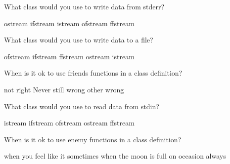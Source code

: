 \documentclass[10pt,addpoints]{exam}
\begin{document}
\begin{questions}
\par\vspace{0.100000in}\begin{minipage}{\linewidth}
\question[2]
What class would you use to write data from stderr?
\medskip
\begin{choices}
\choice ostream
\choice ifstream
\choice istream
\choice ofstream
\choice ffstream
\end{choices}
\setlength\answerlinelength{1in}
\answerline[A]

\end{minipage}


\par\vspace{0.100000in}\begin{minipage}{\linewidth}
\question[2]
What class would you use to write data to a file?
\medskip
\begin{choices}
\choice ofstream
\choice ifstream
\choice ffstream
\choice ostream
\choice istream
\end{choices}
\setlength\answerlinelength{1in}
\answerline[A]

\end{minipage}


\par\vspace{0.100000in}\begin{minipage}{\linewidth}
\question[2]
When is it ok to use friends functions in a class definition?
\medskip
\begin{choices}
\choice not right
\choice Never
\choice still wrong
\choice other
\choice wrong
\end{choices}
\setlength\answerlinelength{1in}
\answerline[B]

\end{minipage}


\par\vspace{0.100000in}\begin{minipage}{\linewidth}
\question[2]
What class would you use to read data from stdin?
\medskip
\begin{choices}
\choice istream
\choice ifstream
\choice ofstream
\choice ostream
\choice ffstream
\end{choices}
\setlength\answerlinelength{1in}
\answerline[A]

\end{minipage}


\par\vspace{0.100000in}\begin{minipage}{\linewidth}
\question[2]
When is it ok to use enemy functions in a class definition?
\medskip
\begin{choices}
\choice when you feel like it
\choice sometimes
\choice when the moon is full
\choice on occasion
\choice always
\end{choices}
\setlength\answerlinelength{1in}
\answerline[E]


\end{minipage}
\end{questions}
\end{document}
